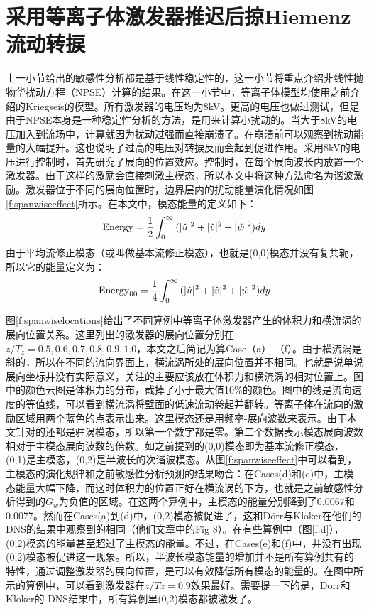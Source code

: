 \section{采用等离子体激发器推迟后掠Hiemenz流动转捩}
上一小节给出的敏感性分析都是基于线性稳定性的，这一小节将重点介绍非线性抛物华扰动方程（NPSE）计算的结果。在这一小节中，等离子体模型均使用之前介绍的Kriegseis的模型\cite{kriegseis2013velocity}。所有激发器的电压均为8kV。更高的电压也做过测试，但是由于NPSE本身是一种稳定性分析的方法，是用来计算小扰动的。当大于8kV的电压加入到流场中，计算就因为扰动过强而直接崩溃了。在崩溃前可以观察到扰动能量的大幅提升。这也说明了过高的电压对转捩反而会起到促进作用。采用8kV的电压进行控制时，首先研究了展向的位置效应。控制时，在每个展向波长内放置一个激发器。由于这样的激励会直接刺激主模态，所以本文中将这种方法命名为谐波激励。激发器位于不同的展向位置时，边界层内的扰动能量演化情况如图\ref{f:spanwiseeffect}所示。在本文中，模态能量的定义如下：
\begin{equation}
{\rm Energy}=\frac{1}{2}\int_{0}^{\infty}{(|\hat u|^2+|\hat v|^2+|\hat w|^2)dy}
\end{equation}
由于平均流修正模态（或叫做基本流修正模态），也就是(0,0)模态并没有复共轭，所以它的能量定义为：
\begin{equation}
{\rm Energy}_{00}=\frac{1}{4}\int_{0}^{\infty}{(|\hat u|^2+|\hat v|^2+|\hat w|^2)dy}
\end{equation}

图\ref{f:spanwiselocations}给出了不同算例中等离子体激发器产生的体积力和横流涡的展向位置关系。这里列出的激发器的展向位置分别在$z/T_z = 0.5, 0.6, 0.7, 0.8, 0.9, 1.0$，本文之后简记为算Case（a）-（f）。由于横流涡是斜的，所以在不同的流向界面上，横流涡所处的展向位置并不相同。也就是说单说展向坐标并没有实际意义，关注的主要应该放在体积力和横流涡的相对位置上。图中的颜色云图是体积力的分布，截掉了小于最大值10\%的颜色。图中的线是流向速度的等值线，可以看到横流涡将壁面的低速流动卷起并翻转。等离子体在流向的激励区域用两个蓝色的点表示出来。这里模态还是用频率-展向波数来表示。由于本文针对的还都是驻涡模态，所以第一个数字都是零。第二个数据表示模态展向波数相对于主模态展向波数的倍数。如之前提到的(0,0)模态即为基本流修正模态，(0,1)是主模态，(0,2)是半波长的次谐波模态。从图\ref{f:spanwiseeffect}中可以看到，主模态的演化规律和之前敏感性分析预测的结果吻合：在Cases(d)和(e)中，主模态能量大幅下降，而这时体积力的位置正好在横流涡的下方，也就是之前敏感性分析得到的$G_w$为负值的区域。在这两个算例中，主模态的能量分别降到了0.0067和0.0077。然而在Cases(a)到(d)中，(0,2)模态被促进了，这和D\"orr与Kloker\cite{dorr2016}在他们的DNS的结果中观察到的相同（他们文章中的Fig 8）。在有些算例中（图\ref{f:d}），(0,2)模态的能量甚至超过了主模态的能量。不过，在Cases(e)和(f)中，并没有出现(0,2)模态被促进这一现象。所以，半波长模态能量的增加并不是所有算例共有的特性，通过调整激发器的展向位置，是可以有效降低所有模态的能量的。在图中所示的算例中，可以看到激发器在$z/Tz=0.9$效果最好。需要提一下的是，D\"orr和Kloker的 DNS\cite{dorr2016}结果中，所有算例里(0,2)模态都被激发了。


